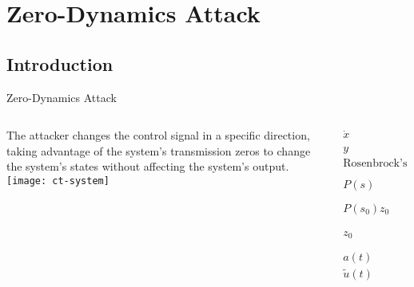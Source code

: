 
\section{Zero-Dynamics Attack}%
\label{sec:zda}

\subsection{Introduction}%
\label{subsec:ts-introduction}

\begin{slide}{Zero-Dynamics Attack}
  \begin{columns}[c]
    \begin{column}{0.48\textwidth}
      The attacker changes the control signal in a specific direction, taking
      advantage of the system's transmission zeros to change the system's states
      without affecting the system's output.
      \texttt{[image: ct-system]}
    \end{column}%
    \hfill%
    \begin{column}{0.48\textwidth}
      \begin{align}
        \dot{x}       & = Ax + Bu                                       \\
        y             & = Cx + Du                                       \\
        \textrm{Rosenbrock's Matrix:} \nonumber                         \\
        P(s)          & = \begin{bmatrix}
                            sI-A & -B \\
                            C    & D
                          \end{bmatrix},                                \\
        P(s_{0})z_{0} & = 0.                                            \\
        z_{0}         & = \begin{bmatrix} x_{0} \\ a_{0} \end{bmatrix}, \\
        a(t)          & = a_{0}e^{s_{0}t},                              \\
        \tilde{u}(t)  & = u(t) + a(t).
      \end{align}
    \end{column}%
  \end{columns}
\end{slide}

